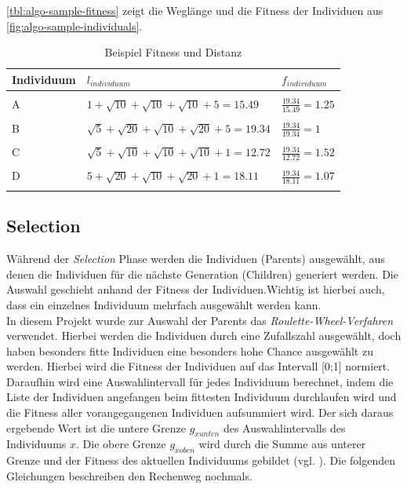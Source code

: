 \documentclass[12pt,a4paper]{scrreprt}
\begin{document}
\autoref{tbl:algo-sample-fitness} zeigt die Weglänge und die Fitness der Individuen aus \autoref{fig:algo-sample-individuals}.

\begin{center}
\begin{longtable}{p{2.0cm} | p{7.0cm} | p{3.0cm}}
Individuum & $l_{individuum}$ & $f_{individuum}$ \\
\hline & & \\
A & $1 + \sqrt{10} + \sqrt{10} + \sqrt{10} + 5 = 15.49$ & $\frac{19.34}{15.49} = 1.25$ \\
& & \\
B & $\sqrt{5} + \sqrt{20} + \sqrt{10} + \sqrt{20} + 5 = 19.34$ & $\frac{19.34}{19.34} = 1$ \\
& & \\
C & $\sqrt{5} + \sqrt{10} + \sqrt{10} + \sqrt{10} + 1 = 12.72$ & $\frac{19.34}{12.72} = 1.52$ \\
& & \\
D & $5 + \sqrt{20} + \sqrt{10} + \sqrt{20} + 1 = 18.11$ & $\frac{19.34}{18.11} = 1.07$\\

\caption{Beispiel Fitness und Distanz}
\label{tbl:algo-sample-fitness}
\end{longtable}
\end{center}

\subsection{Selection}
\label{subsec:selection}

Während der \textit{Selection} Phase werden die Individuen (Parents) ausgewählt, aus denen die Individuen für die nächste Generation (Children) generiert werden. Die Auswahl geschieht anhand der Fitness der Individuen.Wichtig ist hierbei auch, dass ein einzelnes Individuum mehrfach ausgewählt werden kann.\\
In diesem Projekt wurde zur Auswahl der Parents das \textit{Roulette-Wheel-Verfahren} verwendet. Hierbei werden die Individuen durch eine Zufallszahl ausgewählt, doch haben besonders fitte Individuen eine besonders hohe Chance ausgewählt zu werden. Hierbei wird die Fitness der Individuen auf das Intervall [0;1] normiert. Daraufhin wird eine Auswahlintervall für jedes Individuum berechnet, indem die Liste der Individuen angefangen beim fittesten Individuum durchlaufen wird und die Fitness aller vorangegangenen Individuen aufsummiert wird. Der sich daraus ergebende Wert ist die untere Grenze $g_{x unten}$ des Auswahlintervalls des Individuums $x$. Die obere Grenze $g_{x oben}$ wird durch die Summe aus unterer Grenze und der Fitness des aktuellen Individuums gebildet (vgl. \cite{rongqu14}). Die folgenden Gleichungen beschreiben den Rechenweg nochmals.
\end{document}
